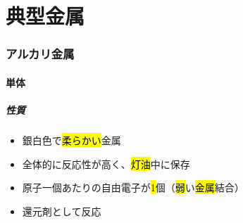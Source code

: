 \part{典型金属}
\section{アルカリ金属}
\subsection{単体}
\subsubsection{性質}
\begin{itemize}
  \item 銀白色で\hl{柔らかい}金属
  \item 全体的に反応性が高く、\hl{灯油}中に保存
  \item 原子一個あたりの自由電子が\hl{1}個（\hl{弱}い\hl{金属}結合）
  \item 還元剤として反応\\
\end{itemize}
